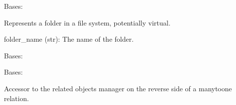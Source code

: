 \documentclass[letterpaper,10pt,english]{sphinxmanual}
\begin{document}
\begin{fulllineitems}
\label{\detokenize{app:app.models.Folder}}
\pysigstartsignatures
{}
\pysigstopsignatures
\sphinxAtStartPar
Bases: 

\sphinxAtStartPar
Represents a folder in a file system, potentially virtual.
\begin{description}
\sphinxAtStartPar
folder\_name (str): The name of the folder.

\end{description}

\begin{fulllineitems}
\label{\detokenize{app:app.models.Folder.DoesNotExist}}
\pysigstartsignatures
{}
\pysigstopsignatures
\sphinxAtStartPar
Bases: 

\end{fulllineitems}


\begin{fulllineitems}
\label{\detokenize{app:app.models.Folder.MultipleObjectsReturned}}
\pysigstartsignatures
{}
\pysigstopsignatures
\sphinxAtStartPar
Bases: 

\end{fulllineitems}


\begin{fulllineitems}
\label{\detokenize{app:app.models.Folder.files}}
\pysigstartsignatures
{}
\pysigstopsignatures
\sphinxAtStartPar
Accessor to the related objects manager on the reverse side of a
many\sphinxhyphen{}to\sphinxhyphen{}one relation.


\end{fulllineitems}
\end{fulllineitems}
\end{document}
